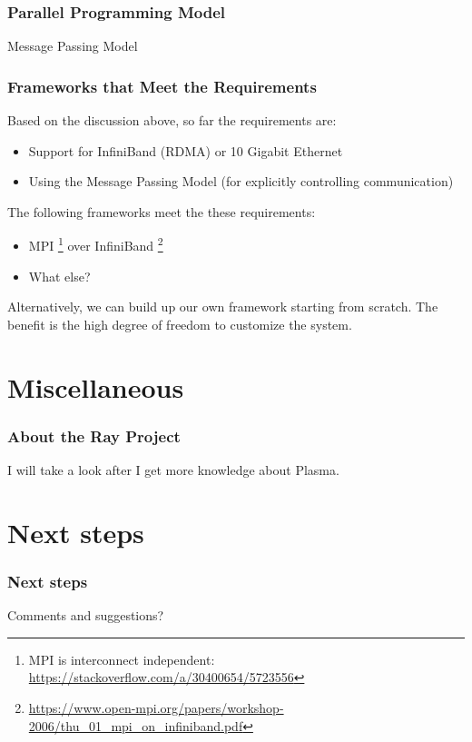 \documentclass{beamer}
\begin{document}

\begin{frame}
\frametitle{Parallel Programming Model}

Message Passing Model

\end{frame}


\begin{frame}
\frametitle{Frameworks that Meet the Requirements}


Based on the discussion above, so far the requirements are:

\begin{itemize}
  \item Support for InfiniBand (RDMA) or 10 Gigabit Ethernet
  \item Using the Message Passing Model (for explicitly controlling communication)
\end{itemize}

The following frameworks meet the these requirements:

\begin{itemize}
  \item MPI \footnote{MPI is interconnect independent: \url{https://stackoverflow.com/a/30400654/5723556}} over InfiniBand 
    \footnote{\url{https://www.open-mpi.org/papers/workshop-2006/thu_01_mpi_on_infiniband.pdf}}
  \item \alert{What else?}
\end{itemize}

Alternatively, we can build up our own framework starting from scratch.
The benefit is the high degree of freedom to customize the system.

\end{frame}


\section{Miscellaneous}


\begin{frame}
\frametitle{About the Ray Project}

I will take a look after I get more knowledge about Plasma.

\end{frame}


\section{Next steps}


\begin{frame}
\frametitle{Next steps}

Comments and suggestions?

\end{frame}
\end{document}

